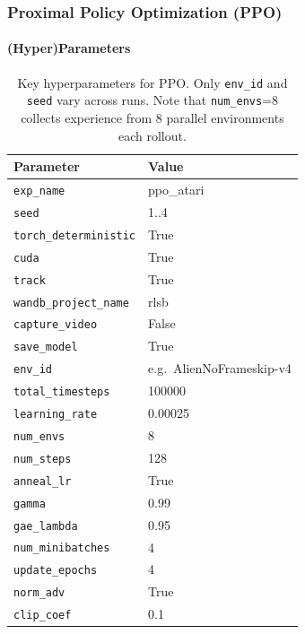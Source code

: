 \subsubsection{Proximal Policy Optimization (PPO)}
\label{subsubsec:ppo}

\paragraph{(Hyper)Parameters}

\begin{table}[htbp]
	\caption{Key hyperparameters for PPO. Only \texttt{env\_id} and \texttt{seed} vary across runs. 
		Note that \texttt{num\_envs}=8 collects experience from 8 parallel environments each rollout.}
	\label{tab:ppo_hyperparams}
	\centering
	\begin{tabular}{ll}
		\toprule
		\textbf{Parameter} & \textbf{Value} \\
		\midrule
		\texttt{exp\_name}            & ppo\_atari \\
		\texttt{seed}                 & 1..4 \\
		\texttt{torch\_deterministic} & True \\
		\texttt{cuda}                 & True \\
		\texttt{track}                & True \\
		\texttt{wandb\_project\_name} & rlsb \\
		\texttt{capture\_video}       & False \\
		\texttt{save\_model}          & True \\
		\texttt{env\_id}              & e.g.\ AlienNoFrameskip-v4 \\
		\texttt{total\_timesteps}     & 100000 \\
		\texttt{learning\_rate}       & 0.00025 \\
		\texttt{num\_envs}            & 8 \\
		\texttt{num\_steps}           & 128 \\
		\texttt{anneal\_lr}           & True \\
		\texttt{gamma}                & 0.99 \\
		\texttt{gae\_lambda}          & 0.95 \\
		\texttt{num\_minibatches}     & 4 \\
		\texttt{update\_epochs}       & 4 \\
		\texttt{norm\_adv}            & True \\
		\texttt{clip\_coef}           & 0.1 \\

\end{tabular}
\end{table}
